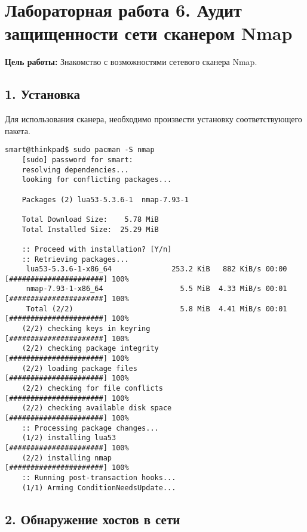 \chapter*{Лабораторная работа 6. Аудит защищенности сети сканером Nmap}

\textbf{Цель работы:} Знакомство с возможностями сетевого сканера Nmap.

\section*{1. Установка}

Для использования сканера, необходимо произвести установку соответствующего пакета.
\begin{Verbatim}[frame=single,breaklines=true,breakanywhere=true]
    smart@thinkpad$ sudo pacman -S nmap
    [sudo] password for smart: 
    resolving dependencies...
    looking for conflicting packages...

    Packages (2) lua53-5.3.6-1  nmap-7.93-1

    Total Download Size:    5.78 MiB
    Total Installed Size:  25.29 MiB

    :: Proceed with installation? [Y/n] 
    :: Retrieving packages...
     lua53-5.3.6-1-x86_64              253.2 KiB   882 KiB/s 00:00 [######################] 100%
     nmap-7.93-1-x86_64                  5.5 MiB  4.33 MiB/s 00:01 [######################] 100%
     Total (2/2)                         5.8 MiB  4.41 MiB/s 00:01 [######################] 100%
    (2/2) checking keys in keyring                                 [######################] 100%
    (2/2) checking package integrity                               [######################] 100%
    (2/2) loading package files                                    [######################] 100%
    (2/2) checking for file conflicts                              [######################] 100%
    (2/2) checking available disk space                            [######################] 100%
    :: Processing package changes...
    (1/2) installing lua53                                         [######################] 100%
    (2/2) installing nmap                                          [######################] 100%
    :: Running post-transaction hooks...
    (1/1) Arming ConditionNeedsUpdate...
\end{Verbatim}

\section*{2. Обнаружение хостов в сети}

